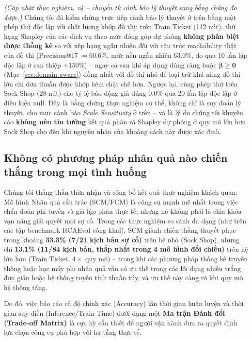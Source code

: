 \documentclass[11pt,a4paper]{article}
\begin{document}
\textit{(Cập nhật thực nghiệm, v4 -- chuyển từ cảnh báo lý thuyết sang bằng chứng đo được.)} Chúng tôi đã kiểm chứng trực tiếp cảnh báo lý thuyết ở trên bằng một phép thử độc lập với chất lượng khớp đồ thị: trên Train Ticket (112 nút), thứ hạng Shapley của các dịch vụ theo mức đóng góp dự phóng \textbf{không phân biệt được thống kê} so với xếp hạng ngẫu nhiên đối với cấu trúc reachability thật của đồ thị (Precision@17 $=60.6\%$, mức nền ngẫu nhiên $63.0\%$, đo qua 10 lần lặp độc lập ở can thiệp $+150\%$) -- ngay cả sau khi áp dụng đúng ràng buộc $\boldsymbol\beta \geq \mathbf 0$ (Mục~\ref{sec:domain-aware}) đồng nhất với đồ thị nhỏ để loại trừ khả năng đồ thị lớn chỉ đơn thuần được khớp kém chặt chẽ hơn. Ngược lại, cùng phép thử trên Sock Shop (28 nút) cho tỷ lệ báo động giả đúng $0.0\%$ qua 20 lần lặp độc lập ở điều kiện null. Đây là bằng chứng thực nghiệm cụ thể, không chỉ là suy đoán lý thuyết, cho mục cảnh báo \emph{Scale Sensitivity} ở trên -- và là lý do chúng tôi khuyến cáo \textbf{không nên tin tưởng} kết quả phân rã Shapley dự phóng ở quy mô lớn hơn Sock Shop cho đến khi nguyên nhân của khoảng cách này được xác định.

\subsection{Không có phương pháp nhân quả nào chiến thắng trong mọi tình huống}
Chúng tôi thẳng thắn thừa nhận và công bố kết quả thực nghiệm khách quan: Mô hình Nhân quả cấu trúc (SCM/FCM) là công cụ mạnh mẽ nhất trong việc chẩn đoán phi tuyến và giả lập phản thực tế, nhưng nó không phải là chìa khóa vạn năng giải quyết mọi sự cố. Trong các thực nghiệm so sánh đa dạng (như trên các tập benchmark RCAEval công khai), SCM giành chiến thắng thuyết phục trong khoảng \textbf{33.3\% (7/21 kịch bản sự cố)} trên hệ nhỏ (Sock Shop), nhưng chỉ \textbf{13.1\% (11/84 kịch bản, thấp nhất trong 4 mô hình đối chiếu)} trên hệ lớn hơn (Train Ticket, $4\times$ quy mô) -- trong khi các phương pháp thống kê truyền thống hoặc học máy phi nhân quả vẫn có ưu thế trong các lỗi dạng nhiễu trắng đơn giản hoặc hệ thống tuyến tính thuần túy, và ưu thế này càng rõ khi quy mô hệ thống tăng.

Do đó, việc báo cáo cả độ chính xác (Accuracy) lẫn thời gian huấn luyện và thời gian suy diễn (Inference/Train Time) dưới dạng một \textbf{Ma trận Đánh đổi (Trade-off Matrix)} là cực kỳ cần thiết để người vận hành đưa ra quyết định lựa chọn công cụ phù hợp với hạ tầng thực tế.
\end{document}
